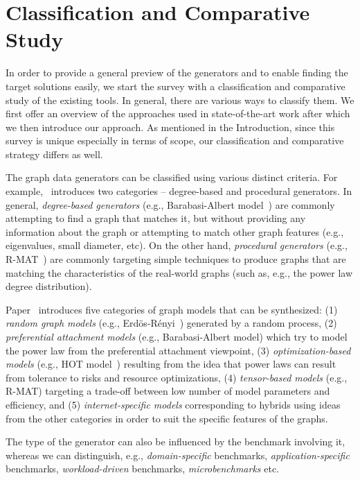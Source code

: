 \section{Classification and Comparative Study}
\label{sec:comparison}

In order to provide a general preview of the generators and  to enable finding the target solutions easily, we start the survey with a  classification and comparative study of the existing tools. In general, there are various ways to classify them. We first offer an overview of the approaches used in state-of-the-art work after which we then introduce our approach. As mentioned in the Introduction, since this survey is unique especially in terms of scope, our classification and comparative strategy differs as well.

The graph data generators can be classified using various distinct criteria. For example,~\cite{DBLP:conf/sdm/ChakrabartiZF04} introduces two categories -- degree-based and procedural generators. In general, \emph{degree-based generators} (e.g., Barabasi-Albert model~\cite{Barabasi99emergenceScaling}) are commonly attempting to find a graph that matches it, but without providing any information about the graph or attempting to match other graph features (e.g., eigenvalues, small diameter, etc). On the other hand, \emph{procedural generators} (e.g., R-MAT~\cite{DBLP:conf/sdm/ChakrabartiZF04}) are commonly targeting simple techniques to produce graphs that are matching the characteristics of the real-world graphs (such as, e.g., the power law degree distribution).

Paper~\cite{Chakrabarti:2006:GML:1132952.1132954} introduces five categories of graph models that can be synthesized: (1) \emph{random graph models} (e.g., Erd\"{o}s-R\'{e}nyi~\cite{Erdos:1960}) generated by a random process, (2) \emph{preferential attachment models} (e.g., Barabasi-Albert model) which try to model the power law from the preferential attachment viewpoint, (3) \emph{optimization-based models} (e.g., HOT model~\cite{PhysRevLett.84.2529}) resulting from the idea that power laws can result from tolerance to risks and resource optimizations, (4) \emph{tensor-based models} (e.g., R-MAT) targeting a trade-off between low number of model parameters and efficiency, and (5) \emph{internet-specific models} corresponding to hybrids using ideas from the other categories in order to suit the specific features of the graphs.

The type of the generator can also be influenced by the benchmark involving it, whereas we can distinguish, e.g., \emph{domain-specific} benchmarks, \emph{application-specific} benchmarks, \emph{workload-driven} benchmarks,  \emph{microbenchmarks} etc.


